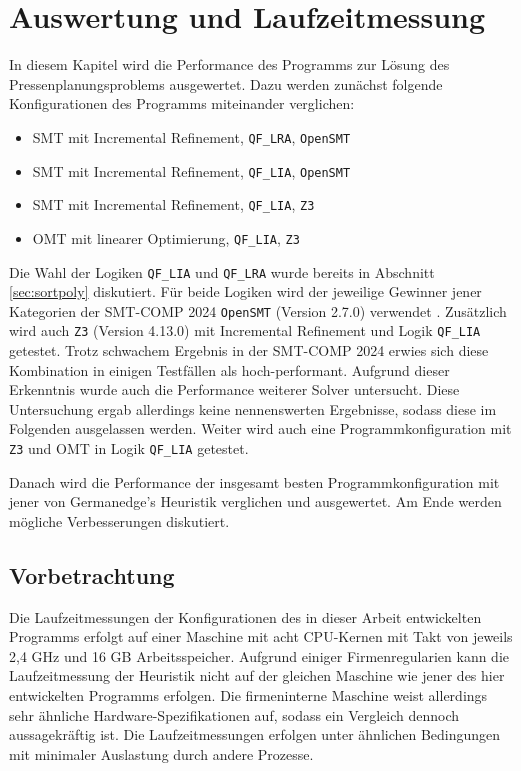 \chapter{Auswertung und Laufzeitmessung}
\label{chapter:auswertung}


In diesem Kapitel wird die Performance des Programms zur Lösung des Pressenplanungsproblems ausgewertet.
Dazu werden zunächst folgende Konfigurationen des Programms miteinander verglichen:
\begin{itemize}
    \item SMT mit Incremental Refinement, \texttt{QF\_LRA}, \texttt{OpenSMT}
    \item SMT mit Incremental Refinement, \texttt{QF\_LIA}, \texttt{OpenSMT}
    \item SMT mit Incremental Refinement, \texttt{QF\_LIA}, \texttt{Z3}
    \item OMT mit linearer Optimierung, \texttt{QF\_LIA}, \texttt{Z3}
\end{itemize}

Die Wahl der Logiken \texttt{QF\_LIA} und \texttt{QF\_LRA} wurde bereits in Abschnitt \ref{sec:sortpoly} diskutiert.
Für beide Logiken wird der jeweilige Gewinner jener Kategorien der SMT-COMP 2024 \texttt{OpenSMT} (Version 2.7.0) verwendet \cite{smtcomp2024results}.
Zusätzlich wird auch \texttt{Z3} (Version 4.13.0) mit Incremental Refinement und Logik \texttt{QF\_LIA} getestet.
Trotz schwachem Ergebnis in der SMT-COMP 2024 erwies sich diese Kombination in einigen Testfällen als hoch-performant.
Aufgrund dieser Erkenntnis wurde auch die Performance weiterer Solver untersucht.
Diese Untersuchung ergab allerdings keine nennenswerten Ergebnisse, sodass diese im Folgenden ausgelassen werden.
Weiter wird auch eine Programmkonfiguration mit \texttt{Z3} und OMT in Logik \texttt{QF\_LIA} getestet.

Danach wird die Performance der insgesamt besten Programmkonfiguration mit jener von Germanedge's Heuristik verglichen und ausgewertet.
Am Ende werden mögliche Verbesserungen diskutiert.

\section{Vorbetrachtung}
Die Laufzeitmessungen der Konfigurationen des in dieser Arbeit entwickelten Programms erfolgt auf einer Maschine mit
acht CPU-Kernen mit Takt von jeweils 2,4 GHz und 16 GB Arbeitsspeicher.
Aufgrund einiger Firmenregularien kann die Laufzeitmessung der Heuristik nicht auf der gleichen Maschine wie jener des hier entwickelten Programms erfolgen.
Die firmeninterne Maschine weist allerdings sehr ähnliche Hardware-Spezifikationen auf, sodass ein Vergleich dennoch aussagekräftig ist.
Die Laufzeitmessungen erfolgen unter ähnlichen Bedingungen mit minimaler Auslastung durch andere Prozesse.

